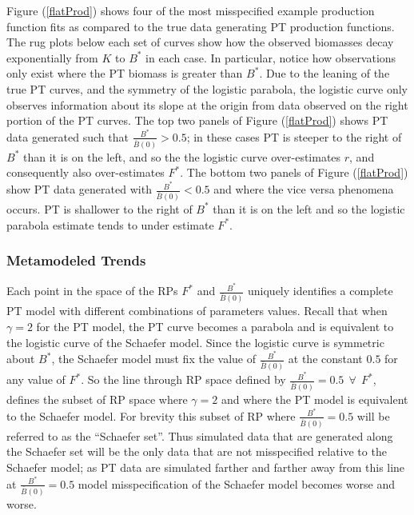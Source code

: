 %
Figure (\ref{flatProd}) shows four of the most misspecified example
production function fits as compared to the true data generating PT production
functions. The rug plots below each set of curves show how the observed
biomasses decay exponentially from $K$ to $B^*$ in each case. In particular,
notice how observations only exist where the PT biomass is greater than $B^*$.
Due to the leaning of the true PT curves, and the symmetry of the logistic
parabola, the logistic curve only observes information about its slope at the
origin from data observed on the right portion of the PT curves. The top two
panels of Figure (\ref{flatProd}) shows PT data generated such
that $\frac{B^*}{\bar B(0)}>0.5$; in these cases PT is steeper to the right of
$B^*$ than it is on the left, and so the the logistic curve over-estimates $r$,
and consequently also over-estimates $F^*$. %
The bottom two panels of Figure (\ref{flatProd}) show PT data
generated with $\frac{B^*}{\bar B(0)}<0.5$ and where the vice versa phenomena
occurs. PT is shallower to the right of $B^*$ than it is on the left and so the
logistic parabola estimate tends to under estimate $F^*$.

%
\subsubsection{Metamodeled Trends}


%
Each point in the space of the RPs $F^*$ and $\frac{B^*}{\bar B(0)}$ uniquely
identifies a complete PT model with different combinations of parameters values.
Recall that when $\gamma=2$ for the PT model, the PT curve becomes a parabola
and is equivalent to the logistic curve of the Schaefer model. Since the
logistic curve is symmetric about $B^*$, the Schaefer model must fix the value of
$\frac{B^*}{\bar B(0)}$ at the constant $0.5$ for any value of $F^*$. So
the line through RP space defined by $\frac{B^*}{\bar B(0)}=0.5 ~~ \forall ~~ F^*$,
defines the subset of RP space where $\gamma=2$ and where the PT model is
equivalent to the Schaefer model. For brevity this subset of RP where $\frac{B^*}{\bar B(0)}=0.5$
will be referred to as the ``Schaefer set''. Thus simulated data that are
generated along the Schaefer set will be the only data that are not
misspecified relative to the Schaefer model; as PT data are simulated
farther and farther away from this line at $\frac{B^*}{\bar B(0)}=0.5$ model
misspecification of the Schaefer model becomes worse and worse.

